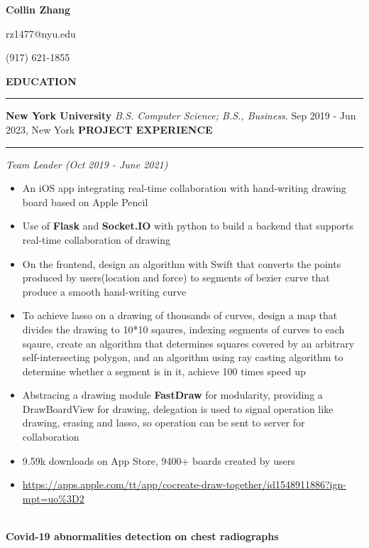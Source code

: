 \documentclass{article}
\begin{document}
\begin{center}
{\huge \textbf{Collin Zhang}}\par
rz1477@nyu.edu\par(917) 621-1855
\end{center}

\noindent
{\textbf{EDUCATION}}\newline
\rule{\textwidth}{1pt}
{\textbf {New York University}}\newline
\emph {B.S. Computer Science; B.S., Business}.\newline
{Sep 2019 - Jun 2023, New York}\newline
\newline
\noindent
{\textbf{PROJECT EXPERIENCE}}\newline
\rule{\textwidth}{1pt}\newline
\emph{Team Leader (Oct 2019 - June 2021)}
\begin{itemize}[leftmargin=*,topsep=0pt]
\item An iOS app integrating real-time collaboration with hand-writing drawing board based on Apple Pencil
\item Use of \textbf{Flask} and \textbf{Socket.IO} with python to build a backend that supports real-time collaboration of drawing
\item On the frontend, design an algorithm with Swift that converts the points produced by users(location and force) to segments of bezier curve that produce a smooth hand-writing curve
\item To achieve lasso on a drawing of thousands of curves, design a map that divides the drawing to 10*10 sqaures, indexing segments of curves to each sqaure, create an algorithm that determines squares covered by an arbitrary self-intersecting polygon, and an algorithm using ray casting algorithm to determine whether a segment is in it, achieve 100 times speed up
\item Abstracing a drawing module \textbf{FastDraw} for modularity, providing a DrawBoardView for drawing, delegation is used to signal operation like drawing, erasing and lasso, so operation can be sent to server for collaboration
\item 9.59k downloads on App Store, 9400+ boards created by users
\item \url{https://apps.apple.com/tt/app/cocreate-draw-together/id1548911886?ign-mpt=uo%3D2}

\end{itemize} \ \\ {\textbf{Covid-19 abnormalities detection on chest radiographs}}\newline
\end{document}

